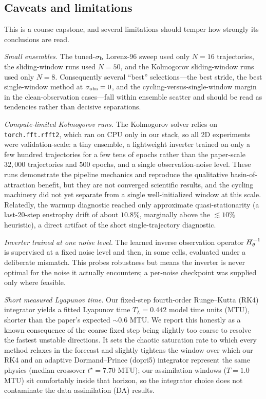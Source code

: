 \subsection{Caveats and limitations}

This is a course capstone, and several limitations should temper how strongly
its conclusions are read.

\emph{Small ensembles.} The tuned-$\sigma_{\mathrm{b}}$ Lorenz-96 sweep used only $N = 16$
trajectories, the sliding-window runs used $N = 50$, and the Kolmogorov
sliding-window runs used only $N = 8$. Consequently several ``best''
selections---the best stride, the best single-window method at $\sigma_{\mathrm{obs}} = 0$,
and the cycling-versus-single-window margin in the clean-observation
cases---fall within ensemble scatter and should be read as tendencies rather
than decisive separations.

\emph{Compute-limited Kolmogorov runs.} The Kolmogorov solver relies on
\texttt{torch.fft.rfft2}, which ran on CPU only in our stack, so all 2D
experiments were validation-scale: a tiny ensemble, a
lightweight inverter trained on only a few hundred trajectories for a few tens
of epochs rather than the paper-scale $32{,}000$ trajectories and $500$
epochs, and a single observation-noise level. These runs demonstrate the
pipeline mechanics and reproduce the qualitative basin-of-attraction benefit,
but they are not converged scientific results, and the cycling machinery did
not yet separate from a single well-initialized window at this scale.
Relatedly, the warmup diagnostic reached only approximate quasi-stationarity
(a last-$20$-step enstrophy drift of about $10.8\%$, marginally above the
$\lesssim 10\%$ heuristic), a direct artifact of the short single-trajectory
diagnostic.

\emph{Inverter trained at one noise level.} The learned inverse observation
operator $H^{-1}_{\theta}$ is supervised at a fixed noise level and then, in some cells,
evaluated under a deliberate mismatch. This probes robustness but means the
inverter is never optimal for the noise it actually encounters; a per-noise
checkpoint was supplied only where feasible.

\emph{Short measured Lyapunov time.} Our fixed-step fourth-order
Runge--Kutta (RK4) integrator yields a fitted Lyapunov time
$T_L = 0.442$ model time units (MTU), shorter than the paper's expected
$\sim 0.6$ MTU. We report this honestly as a known consequence of the coarse
fixed step being slightly too coarse to resolve the fastest unstable
directions. It sets the chaotic saturation rate to which every method relaxes
in the forecast and slightly tightens the window over which our RK4 and an
adaptive Dormand--Prince (dopri5) integrator represent the same physics
(median crossover $t^\star = 7.70$ MTU); our assimilation windows
($T = 1.0$ MTU) sit comfortably inside that horizon, so the integrator choice
does not contaminate the data assimilation (DA) results.

